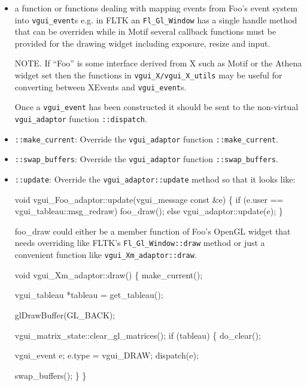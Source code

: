 \documentclass[12pt]{report} \usepackage{epsfig}
\begin{document}
\begin{itemize}
\item  a function or functions dealing with mapping events from Foo's event system into {\tt vgui\_event}s
e.g.  in FLTK an {\tt Fl\_Gl\_Window} has a single handle method that can be overriden
while in Motif several callback functions must be provided for the drawing widget
including  exposure, resize and input.

NOTE.  If ``Foo'' is some interface derived from X  such as Motif or the Athena widget set
then the functions in {\tt vgui\_X/vgui\_X\_utils} may be useful for converting between XEvents and 
{\tt vgui\_event}s.

Once a {\tt vgui\_event} has been constructed it should be sent to the non-virtual {\tt vgui\_adaptor}
function {\tt ::dispatch}.
 
\item {\tt ::make\_current}: Override the {\tt vgui\_adaptor} function {\tt ::make\_current}.

\item {\tt ::swap\_buffers}: Override the {\tt vgui\_adaptor} function {\tt ::swap\_buffers}.

\item {\tt ::update}: Override the {\tt vgui\_adaptor::update} method so that it looks like:

{\scriptsize 
\begin{verbawf}
  void vgui\_Foo\_adaptor::update(vgui\_message const &e)
  \{
    if (e.user == vgui\_tableau::msg\_redraw)
      foo\_draw();
    else
      vgui\_adaptor::update(e);
  \}
\end{verbawf}
}
 
foo\_draw could either be a member function of Foo's OpenGL widget that needs 
overriding like  FLTK's {\tt Fl\_Gl\_Window::draw} method or just a convenient function like 
{\tt vgui\_Xm\_adaptor::draw}.

{\scriptsize
\begin{verbawf} 
  void vgui\_Xm\_adaptor::draw() 
  \{
    make\_current();
 
    vgui\_tableau *tableau = get\_tableau();
 
    glDrawBuffer(GL\_BACK);
 
    vgui\_matrix\_state::clear\_gl\_matrices();
    if (tableau) 
    \{
      do\_clear();
 
      vgui\_event e;
      e.type = vgui\_DRAW;
      dispatch(e);
 
      swap\_buffers();
    \}
  \}
\end{verbawf}
} 
\end{itemize}
 
\end{document}
